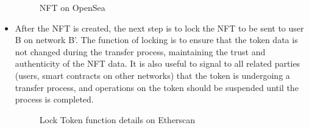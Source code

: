 \begin{itemize}
    \begin{figure} [H] \centering
    \caption{NFT on OpenSea}
    \label{fig:nft_opensea}
    \end{figure}

    \item After the NFT is created, the next step is to lock the NFT to be sent to user B on network B'. The function of locking is to ensure that the token data is not changed during the transfer process, maintaining the trust and authenticity of the NFT data. It is also useful to signal to all related parties (users, smart contracts on other networks) that the token is undergoing a transfer process, and operations on the token should be suspended until the process is completed.

    \begin{figure} [H] \centering
    \caption{Lock Token function details on Etherscan}
    \label{fig:locktoken}
    \end{figure}


\end{itemize}
